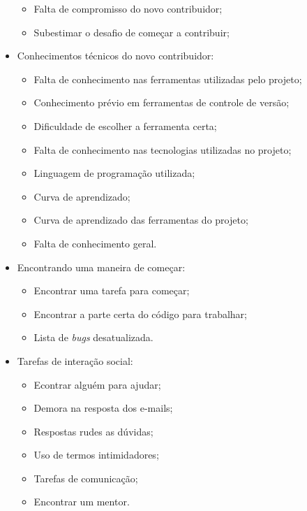 \begin{itemize}
	\begin{itemize}
	\item Falta de compromisso do novo contribuidor;
	\item Subestimar o desafio de começar a contribuir;
	\end{itemize}

\item Conhecimentos técnicos do novo contribuidor:

	\begin{itemize}
	\item Falta de conhecimento nas ferramentas utilizadas pelo projeto;
	\item Conhecimento prévio em ferramentas de controle de versão;
	\item Dificuldade de escolher a ferramenta certa;
	\item Falta de conhecimento nas tecnologias utilizadas no projeto;
	\item Linguagem de programação utilizada;
	\item Curva de aprendizado;
	\item Curva de aprendizado das ferramentas do projeto;
	\item Falta de conhecimento geral.
	\end{itemize}

\item Encontrando uma maneira de começar:
	
	\begin{itemize}
	\item Encontrar uma tarefa para começar;
	\item Encontrar a parte certa do código para trabalhar;
	\item Lista de \textit{bugs} desatualizada.
	\end{itemize}

\item Tarefas de interação social:
	
	\begin{itemize}
	\item Econtrar alguém para ajudar;
	\item Demora na resposta dos e-mails;
	\item Respostas rudes as dúvidas;
	\item Uso de termos intimidadores;
	\item Tarefas de comunicação;
	\item Encontrar um mentor.
	\end{itemize}

\end{itemize} 


